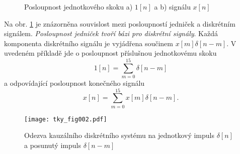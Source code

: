       \begin{figure}[ht!]
        \centering  
        \caption{Posloupnost jednotkového skoku a) \(1[n]\) a b) signálu \(x[n]\)}
        \label{tky:fig_006}
      \end{figure}

      Na obr. \ref{tky:fig_006} je znázorněna souvislost mezi posloupností jedniček a diskrétním
      signálem. \emph{Posloupnost jedniček tvoří bázi pro diskrétní signály}. Každá komponenta
      diskrétního signálu je vyjádřena součinem $x[m]\delta[n-m]$. V uvedeném příkladě jde o
      posloupnost příslušnou jednotkovému skoku
      \begin{equation*}
        1[n]=\sum_{m=0}^{15}\delta[n-m]
      \end{equation*}
      a odpovídající posloupnost konečného signálu
      \begin{equation*}
        x[n]=\sum_{m=0}^{15}x[m]\delta[n-m].
      \end{equation*}

      \begin{figure*}[ht!]
        \centering
        \texttt{[image: tky\_fig002.pdf]}
         \caption[impulsní odezva]{Odezva kauzálního diskrétního systému na jednotkový impuls
                  $\delta[n]$ a posunutý impuls $\delta[n-m]$}
        \label{tky:fig002}
      \end{figure*}

